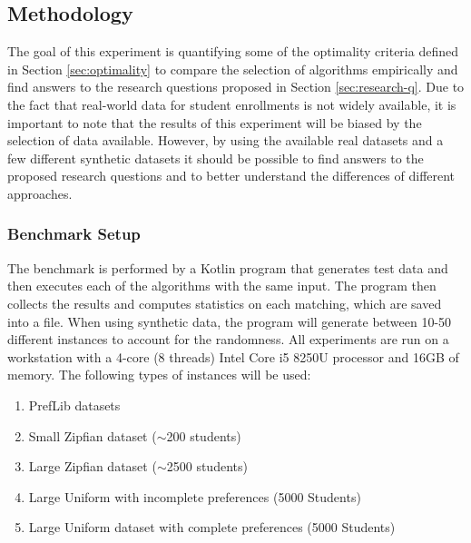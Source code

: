 \subsection{Methodology}
The goal of this experiment is quantifying some of the optimality criteria defined in Section \ref{sec:optimality} to compare the selection of algorithms empirically and find answers to the research questions proposed in Section \ref{sec:research-q}. Due to the fact that real-world data for student enrollments is not widely available, it is important to note that the results of this experiment will be biased by the selection of data available. However, by using the available real datasets and a few different synthetic datasets it should be possible to find answers to the proposed research questions and to better understand the differences of different approaches.

\subsubsection{Benchmark Setup}
The benchmark is performed by a Kotlin program that generates test data and then executes each of the algorithms with the same input. The program then collects the results and computes statistics on each matching, which are saved into a file. When using synthetic data, the program will generate between 10-50 different instances to account for the randomness. All experiments are run on a workstation with a 4-core (8 threads) Intel Core i5 8250U processor and 16GB of memory. The following types of instances will be used:
\begin{enumerate}
  \item PrefLib datasets
  \item Small Zipfian dataset ($\sim$200 students)
  \item Large Zipfian dataset ($\sim$2500 students)
  \item Large Uniform with incomplete preferences (5000 Students)
  \item Large Uniform dataset with complete preferences (5000 Students)
\end{enumerate}

